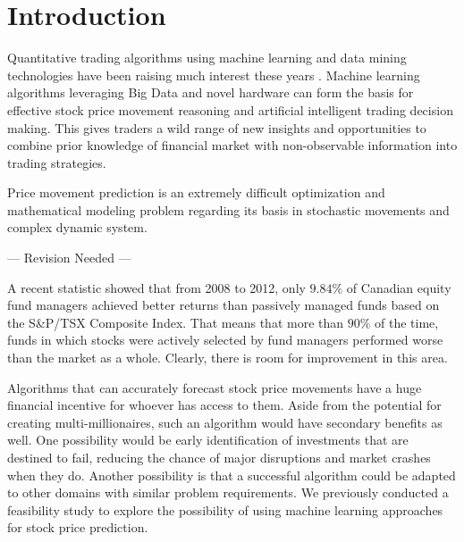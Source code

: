 

\section{Introduction}
\label{sec:intro}

Quantitative trading algorithms using machine learning and data
mining technologies have been raising much interest these years
\cite{fasanghari2010design,cremers2009active,hsu2011hybrid,leung2013discovering}.
Machine learning algorithms leveraging Big Data and novel
hardware can form the basis for effective stock price movement
reasoning and artificial intelligent trading decision making.
This gives traders a wild range of new insights and opportunities
to combine prior knowledge of financial market with non-observable
information into trading strategies.

Price movement prediction is an extremely difficult optimization
and mathematical modeling problem regarding its basis in
stochastic movements and complex dynamic system.

--- Revision Needed ---

A recent statistic showed that from 2008 to 2012, only $9.84\%$
of Canadian equity fund managers achieved better returns than
passively managed funds based on the S\&P/TSX Composite Index.
That means that more than $90\%$ of the time, funds in which
stocks were actively selected by fund managers performed worse
than the market as a whole. Clearly, there is room for
improvement in this area.

Algorithms that can accurately forecast stock price movements
have a huge financial incentive for whoever has access to them.
Aside from the potential for creating multi-millionaires, such an
algorithm would have secondary benefits as well. One possibility
would be early identification of investments that are destined to
fail, reducing the chance of major disruptions and market crashes
when they do. Another possibility is that a successful algorithm
could be adapted to other domains with similar problem
requirements. We previously conducted a feasibility study
\cite{mackinnon2015stock} to explore the possibility of using
machine learning approaches for stock price prediction.

